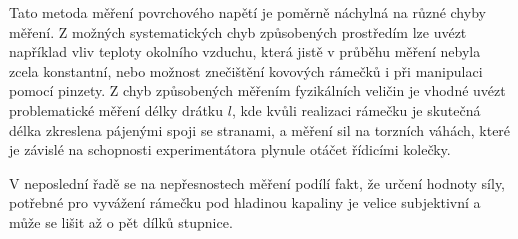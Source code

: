 \documentclass[protokol.tex]{subfiles}
\begin{document}
Tato metoda měření povrchového napětí je poměrně náchylná na různé chyby měření. Z možných systematických chyb způsobených prostředím lze uvézt například vliv teploty okolního vzduchu, která jistě v průběhu měření nebyla zcela konstantní, nebo možnost znečištění kovových rámečků i při manipulaci pomocí pinzety.
Z chyb způsobených měřením fyzikálních veličin je vhodné uvézt problematické měření délky drátku $l$, kde kvůli realizaci rámečku je skutečná délka zkreslena pájenými spoji se stranami, a měření sil na torzních váhách, které je závislé na schopnosti experimentátora plynule otáčet řídicími kolečky.

V neposlední řadě se na nepřesnostech měření podílí fakt, že určení hodnoty síly, potřebné pro vyvážení rámečku pod hladinou kapaliny je velice subjektivní a může se lišit až o pět dílků stupnice. 
\end{document}
